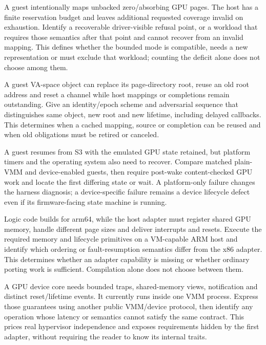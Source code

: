 {A guest intentionally maps unbacked zero/absorbing GPU pages. The host has a finite reservation
budget and leaves additional requested coverage invalid on exhaustion.}
{Identify a recoverable driver-visible refusal point, or a workload that requires those semantics
after that point and cannot recover from an invalid mapping.}
{This defines whether the bounded mode is compatible, needs a new representation or must exclude
that workload; counting the deficit alone does not choose among them.}
\label{q:sparse}

{A guest VA-space object can replace its page-directory root, reuse an old root address and reset
a channel while host mappings or completions remain outstanding.}
{Give an identity/epoch scheme and adversarial sequence that distinguishes same object, new root
and new lifetime, including delayed callbacks.}
{This determines when a cached mapping, source or completion can be reused and when old
obligations must be retired or canceled.}
\label{q:root}

{A guest resumes from S3 with the emulated GPU state retained, but platform timers and the
operating system also need to recover.}
{Compare matched plain-VMM and device-enabled guests, then require post-wake content-checked GPU
work and locate the first differing state or wait.}
{A platform-only failure changes the harness diagnosis; a device-specific failure remains a device
lifecycle defect even if its firmware-facing state machine is running.}
\label{q:resume}

{Logic code builds for arm64, while the host adapter must register shared GPU memory, handle
different page sizes and deliver interrupts and resets.}
{Execute the required memory and lifecycle primitives on a VM-capable ARM host and identify which
ordering or fault-resumption semantics differ from the x86 adapter.}
{This determines whether an adapter capability is missing or whether ordinary porting work is
sufficient. Compilation alone does not choose between them.}
\label{q:arm}

{A GPU device core needs bounded traps, shared-memory views, notification and distinct
reset/lifetime events. It currently runs inside one VMM process.}
{Express those guarantees using another public VMM/device protocol, then identify any operation
whose latency or semantics cannot satisfy the same contract.}
{This prices real hypervisor independence and exposes requirements hidden by the first adapter,
without requiring the reader to know its internal traits.}
\label{q:vmm}

